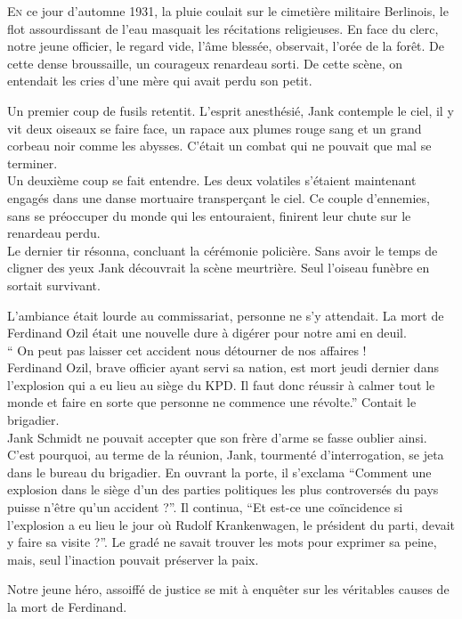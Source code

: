 \lettrine{E}{n} ce jour d'automne 1931, la pluie coulait sur le cimetière militaire Berlinois,
le flot assourdissant de l'eau masquait les récitations religieuses.
En face du clerc, notre jeune officier, le regard vide, l'âme blessée, observait, l'orée de la forêt. 
De cette dense broussaille, un courageux renardeau sorti.
De cette scène, on entendait les cries d'une mère qui avait perdu son petit.

Un premier coup de fusils retentit.
L'esprit anesthésié, Jank contemple le ciel, il y vit deux oiseaux se faire face, un rapace aux plumes rouge sang et un grand corbeau noir comme les abysses.
C'était un combat qui ne pouvait que mal se terminer.\\
Un deuxième coup se fait entendre.
Les deux volatiles s'étaient maintenant engagés dans une danse mortuaire transperçant le ciel.
Ce couple d'ennemies, sans se préoccuper du monde qui les entouraient, finirent leur chute sur le renardeau perdu.\\
Le dernier tir résonna, concluant la cérémonie policière.
Sans avoir le temps de cligner des yeux Jank découvrait la scène meurtrière.
Seul l'oiseau funèbre en sortait survivant.

L'ambiance était lourde au commissariat, personne ne s'y attendait.
La mort de Ferdinand Ozil était une nouvelle dure à digérer pour notre ami en deuil.\\
\enquote{%
    On peut pas laisser cet accident nous détourner de nos affaires !\\
    Ferdinand Ozil, brave officier ayant servi sa nation, est mort jeudi dernier dans l'explosion qui a eu lieu au siège du KPD.
    Il faut donc réussir à calmer tout le monde et faire en sorte que personne ne commence une révolte.}
Contait le brigadier.\\
Jank Schmidt ne pouvait accepter que son frère d'arme se fasse oublier ainsi.
C'est pourquoi, au terme de la réunion, Jank, tourmenté d'interrogation, se jeta dans le bureau du brigadier.
En ouvrant la porte, il s'exclama
\enquote{Comment une explosion dans le siège d'un des parties politiques les plus controversés du pays puisse n'être qu'un accident ?}.
Il continua,
\enquote{Et est-ce une coïncidence si l'explosion a eu lieu le jour où Rudolf Krankenwagen, le président du parti, devait y faire sa visite ?}.
Le gradé ne savait trouver les mots pour exprimer sa peine, mais, seul l'inaction pouvait préserver la paix.

Notre jeune héro, assoiffé de justice se mit à enquêter sur les véritables causes de la mort de Ferdinand.

